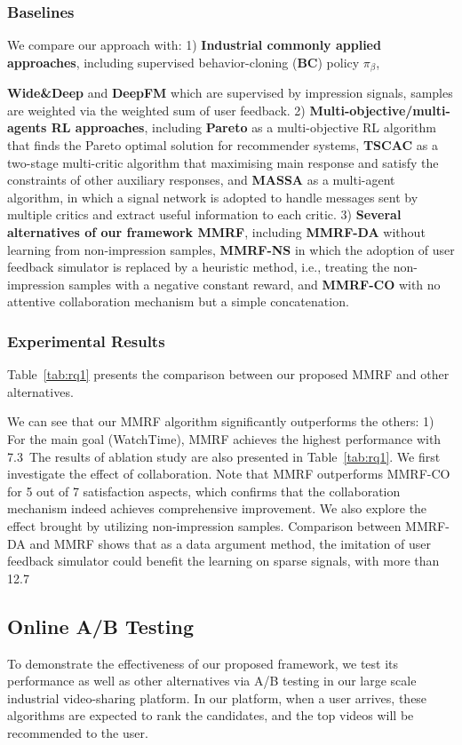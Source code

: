 \subsubsection{Baselines} 
We compare our approach with: 1) \textbf{Industrial commonly applied approaches}, including supervised behavior-cloning (\textbf{BC}) policy $\pi_{\beta}$, {\textbf{Wide\&Deep} \cite{WideandDeep2016} and \textbf{DeepFM} \cite{dfm2017} which are supervised by impression signals, samples are weighted via the weighted sum of user feedback. 
2) \textbf{Multi-objective/multi-agents RL approaches}, including \textbf{Pareto} \cite{ChenXu2021} as a multi-objective RL algorithm that finds the Pareto optimal solution for recommender systems, \textbf{TSCAC} \cite{cai2023two} as a two-stage multi-critic algorithm that maximising main response and satisfy the constraints of other auxiliary responses, and \textbf{MASSA} \cite{HEXu2020RL} as a multi-agent algorithm, in which a signal network is adopted to handle messages sent by multiple critics and extract useful information to each critic.
3) \textbf{Several alternatives of our framework MMRF}, including \textbf{MMRF-DA} without learning from non-impression samples, \textbf{MMRF-NS} in which the adoption of user feedback simulator is replaced by a heuristic method, i.e., treating the non-impression samples with a negative constant reward, and \textbf{MMRF-CO} with no attentive collaboration mechanism but a simple concatenation.


\subsubsection{Experimental Results} 
Table~\ref{tab:rq1} presents the comparison between our proposed MMRF and other alternatives. 

We can see that our MMRF algorithm significantly outperforms the others: 1) For the main goal (WatchTime), MMRF achieves the highest performance with 7.3\
The results of ablation study are also presented in Table~\ref{tab:rq1}.
We first investigate the effect of collaboration. Note that MMRF outperforms MMRF-CO for 5 out of 7 satisfaction aspects, which confirms that the collaboration mechanism indeed achieves comprehensive improvement.
We also explore the effect brought by utilizing non-impression samples. Comparison between MMRF-DA and MMRF shows that as a data argument method, the imitation of user feedback simulator could benefit the learning on sparse signals, with more than 12.7\


\subsection{Online A/B Testing}
To demonstrate the effectiveness of our proposed framework, we test its performance as well as other alternatives via A/B testing in our large scale industrial video-sharing platform. In our platform, when a user arrives, these algorithms are expected to rank the candidates, and the top videos will be recommended to the user.

}
